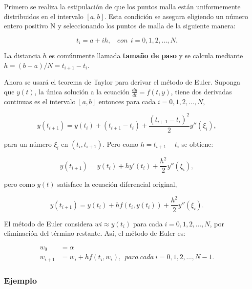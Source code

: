 Primero se realiza la estipulación de que los puntos malla están uniformemente distribuidos en el intervalo $[a,b]$. Esta condición se asegura eligiendo un número entero positivo N y seleccionando los puntos de malla de la siguiente manera:

\begin{equation*}
    t_i=a+ih, \ \ \ \ con \ \ i=0,1,2, \dotsc, N.
\end{equation*}

La distancia $h$ es comúnmente llamada \textbf{tamaño de paso} y se calcula mediante $h=(b-a)/N=t_{i+1}-t_i$. 

Ahora se usará el teorema de Taylor para derivar el método de Euler. Suponga que $y(t)$, la única solución a la ecuación $\frac{dy}{dt}=f(t,y)$, tiene dos derivadas continuas es el intervalo $[a,b]$ entonces para cada $i=0,1,2, \dotsc, N$, 

\begin{equation*}
    y(t_{i+1})=y(t_i)+(t_{i+1}-t_i)+\frac{(t_{i+1}-t_i)^2}{2}y''(\xi_i),
\end{equation*}

para un número $\xi_i$ en $(t_i,t_{i+1})$. Pero como $h=t_{i+1}-t_i$ se obtiene: 

\begin{equation*}
    y(t_{i+1})=y(t_i)+h y'(t_i)+\frac{h^2}{2}y''(\xi_i),
\end{equation*}

pero como $y(t)$ satisface la ecuación diferencial original,

\begin{equation*}
    y(t_{i+1})=y(t_i)+h f(t_i,y(t_i))+\frac{h^2}{2}y''(\xi_i).
\end{equation*}

El método de Euler considera $wi\approx y(t_i)$ para cada $i=0,1,2, \dotsc, N$, por eliminación del término restante. Así, el método de Euler es: 

\begin{equation*}
\begin{split}
    w_0&=\alpha \\
    w_{i+1}&=w_i+hf(t_i,w_i), \ \ para \ cada \ i=0,1,2, \dotsc, N-1.
\end{split}
\end{equation*}

\subsubsection*{Ejemplo}

